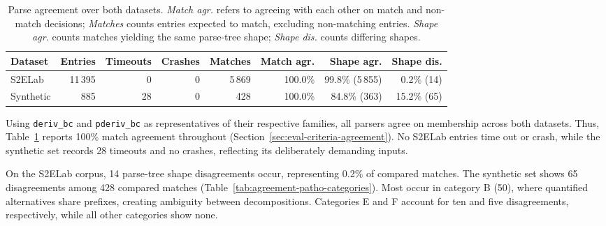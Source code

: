 \begin{table}[H]
\centering
\small
\setlength{\tabcolsep}{4pt}
\begin{tabular*}{\textwidth}{@{\extracolsep{\fill}} lrrrrrrr}
\hline
Dataset & Entries & Timeouts & Crashes & Matches & Match agr. & Shape agr. & Shape dis. \\
\hline
S2ELab    & 11\,395 &   0 & 0 & 5\,869 & 100.0\% & 99.8\% (5\,855) & 0.2\% (14) \\
Synthetic &    885 &  28 & 0 &   428 & 100.0\% & 84.8\% (363)   & 15.2\% (65) \\
\hline
\end{tabular*}
\caption{Parse agreement over both datasets. \emph{Match agr.} 
refers to agreeing with each other on match and non-match decisions; 
\emph{Matches} counts entries expected to match,
excluding non-matching entries.
\emph{Shape agr.} counts matches yielding the same parse-tree shape;
\emph{Shape dis.} counts differing shapes.}
\label{tab:agreement}
\end{table}

Using \texttt{deriv\_bc} and \texttt{pderiv\_bc}
as representatives of their respective families,
all parsers agree on membership across both datasets.
Thus, Table~\ref{tab:agreement} reports 100\%
match agreement throughout
(Section~\ref{sec:eval-criteria-agreement}).
No S2ELab entries time out or crash, while the
synthetic set records 28 timeouts and no crashes,
reflecting its deliberately demanding inputs.

On the S2ELab corpus, 14 parse-tree shape
disagreements occur, representing 0.2\%
of compared matches.
The synthetic set shows 65 disagreements
among 428 compared matches
(Table~\ref{tab:agreement-patho-categories}).
Most occur in category B (50), where
quantified alternatives share prefixes,
creating ambiguity between decompositions.
Categories E and F account for ten and five
disagreements, respectively, while all
other categories show none.

